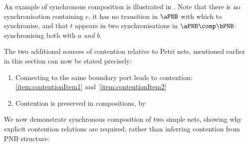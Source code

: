 An example of synchronous composition is illustrated in
. Note that there is no synchronisation
containing $c$, it has no transition in $\aPNB$ with which to synchronise, and
that $t$ appears in two synchronisations in $\aPNB \comp \bPNB$: synchronising
both with $a$ \emph{and} $b$.

The two additional sources of contention relative to Petri nets, mentioned
earlier in this section can now be stated precisely:
\begin{enumerate}
    \item Connecting to the same boundary port leads to contention:
        \ref{item:contentionItem1}
        and~\ref{item:contentionItem2}
    \item Contention is preserved in compositions, by 
\end{enumerate}

We now demonstrate synchronous composition of two simple nets, showing why
explicit contention relations are required, rather than inferring contention
from PNB structure:

